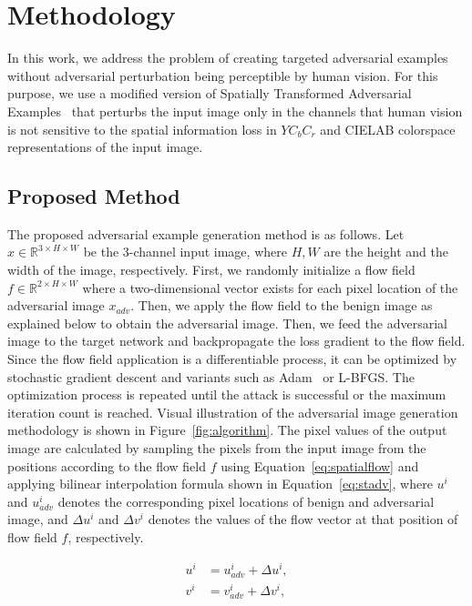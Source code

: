 \chapter{Methodology}
\label{chp:3_methodology}
In this work, we address the problem of creating targeted adversarial examples without adversarial perturbation being perceptible by human vision. For this purpose, we use a modified version of Spatially Transformed Adversarial Examples~\cite{xiao2018spatially} that perturbs the input image only in the channels that human vision is not sensitive to the spatial information loss in \(YC_{b}C_{r}\) and CIELAB colorspace representations of the input image.

\section{Proposed Method}

The proposed adversarial example generation method is as follows. Let \(x \in \mathbb{R}^{3\times H \times W}\) be the 3-channel input image, where \(H, W\) are the height and the width of the image, respectively. First, we randomly initialize a flow field \(f \in \mathbb{R}^{2\times H \times W}\) where a two-dimensional vector exists for each pixel location of the adversarial image \(x_{adv}\). Then, we apply the flow field to the benign image as explained below to obtain the adversarial image. Then, we feed the adversarial image to the target network and backpropagate the loss gradient to the flow field. Since the flow field application is a differentiable process, it can be optimized by stochastic gradient descent and variants such as Adam~\cite{kingma2015adam} or L-BFGS\cite{liu1989limited}. The optimization process is repeated until the attack is successful or the maximum iteration count is reached. Visual illustration of the adversarial image generation methodology is shown in Figure~\ref{fig:algorithm}. The pixel values of the output image are calculated by sampling the pixels from the input image from the positions according to the flow field \(f\) using Equation~\ref{eq:spatialflow} and applying bilinear interpolation formula shown in Equation~\ref{eq:stadv}, where \(u^{i}\) and \(u_{adv}^{i}\) denotes the corresponding pixel locations of benign and adversarial image, and \(\Delta u^i\) and \(\Delta v^i\) denotes the values of the flow vector at that position of flow field \(f\), respectively.

\begin{equation}
    \label{eq:spatialflow}
    \begin{split}
        u^i &= u_{adv}^i + \Delta u^i, \\
        v^i &= v_{adv}^i + \Delta v^i,
    \end{split}
\end{equation}


